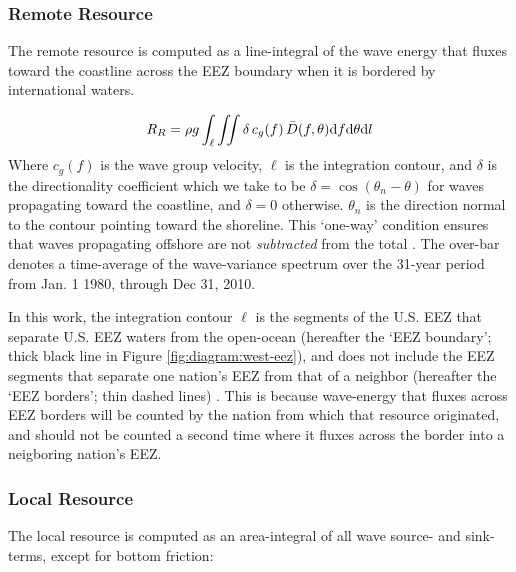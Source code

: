 \subsubsection{Remote Resource} \label{sec:method:calc:remote}

The remote resource is computed as a line-integral of the wave energy that fluxes toward the coastline across the EEZ boundary when it is bordered by international waters. 

\begin{align}
  R_R = \rho g \int_{\ell}\iint \delta \, c_g(f) \, \bar{D}(f,\theta) \mathrm{d} f \mathrm{d} \theta \mathrm{d} l
\label{eqn:RR}
\end{align}
Where $c_g(f)$ is the wave group velocity, $\ell$ is the integration contour, and $\delta$ is the directionality coefficient which we take to be $\delta = \cos(\theta_n - \theta)$ for waves propagating toward the coastline, and $\delta = 0$ otherwise. 
$\theta_n$ is the direction normal to the contour pointing toward the shoreline. 
This `one-way' condition ensures that waves propagating offshore are not {\em subtracted} from the total \citep[]{gunnQuantifyingGlobalWave2012}.
The over-bar denotes a time-average of the wave-variance spectrum over the 31-year period from Jan. 1 1980, through Dec 31, 2010.

In this work, the integration contour $\ell$ is the segments of the U.S. EEZ that separate U.S. EEZ waters from the open-ocean (hereafter the `EEZ boundary'; thick black line in Figure \ref{fig:diagram:west-eez}), and does not include the EEZ segments that separate one nation's EEZ from that of a neighbor (hereafter the `EEZ borders'; thin dashed lines) \citep[]{flandersmarineinstituteMaritimeBoundariesGeodatabase2018}. This is because wave-energy that fluxes across EEZ borders will be counted by the nation from which that resource originated, and should not be counted a second time where it fluxes across the border into a neigboring nation's EEZ.


\subsubsection{Local Resource} \label{sec:method:calc:local}

The local resource is computed as an area-integral of all wave source- and sink-terms, except for bottom friction:

